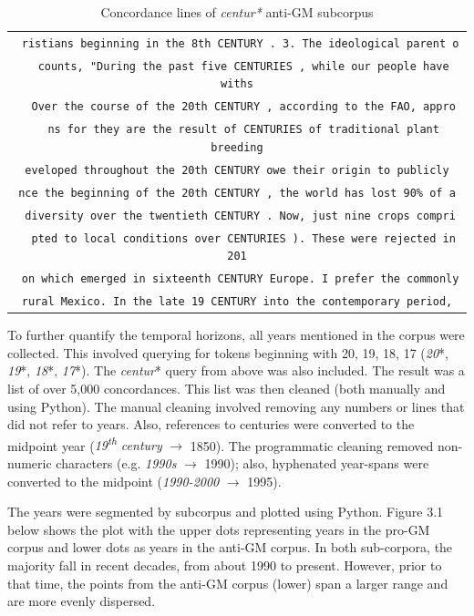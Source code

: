 \begin{table}[H]
\begin{footnotesize}
\begin{tabular}{c}
\texttt{\ ristians beginning in the 8th CENTURY . 3. The ideological parent o} \\
\texttt{\ \ counts, "During the past five CENTURIES , while our people have withs} \\
\texttt{\ \ Over the course of the 20th CENTURY , according to the FAO, appro} \\
\texttt{\ \ ns for they are the result of CENTURIES of traditional plant breeding} \\
\texttt{eveloped throughout the 20th CENTURY owe their origin to publicly} \\
\texttt{nce the beginning of the 20th CENTURY , the world has lost 90\% of a} \\
\texttt{ diversity over the twentieth CENTURY . Now, just nine crops compri} \\
\texttt{\ \ pted to local conditions over CENTURIES ). These were rejected in 201} \\
\texttt{\ on which emerged in sixteenth CENTURY Europe. I prefer the commonly} \\
\texttt{rural Mexico. In the late 19 CENTURY into the contemporary period,} \\
 \end{tabular}
\caption{Concordance lines of \textit{centur*} anti-GM subcorpus}
\label{tab:table1}
\end{footnotesize}
\end{table}

To further quantify the temporal horizons, all years mentioned in the corpus were collected. This involved querying for tokens beginning with 20, 19, 18, 17 (\textit{20}*, \textit{19}*, \textit{18}*, \textit{17}*). The \textit{centur}* query from above was also included. The result was a list of over 5,000 concordances. This list was then cleaned (both manually and using Python). The manual cleaning involved removing any numbers or lines that did not refer to years. Also, references to centuries were converted to the midpoint year (\textit{19\textsuperscript{th} century} $\rightarrow$ 1850). The programmatic cleaning removed non-numeric characters (e.g. \textit{1990s} $\rightarrow$ 1990); also, hyphenated year-spans were converted to the midpoint (\textit{1990-2000} $\rightarrow$ 1995). 

The years were segmented by subcorpus and plotted using Python. Figure 3.1 below shows the plot with the upper dots representing years in the pro-GM corpus and lower dots as years in the anti-GM corpus. In both sub-corpora, the majority fall in recent decades, from about 1990 to present. However, prior to that time, the points from the anti-GM corpus (lower) span a larger range and are more evenly dispersed. 


